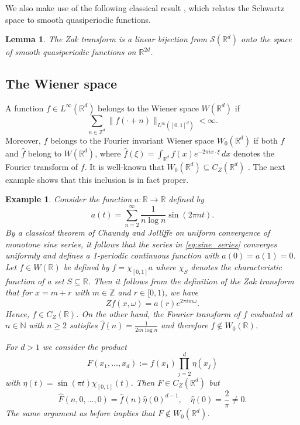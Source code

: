\documentclass[reqno,a4paper,12pt]{amsart}
\numberwithin{equation}{section}
\newtheorem{lemma}[definition]{Lemma}
\newtheorem{example}[definition]{Example}
\def\N{{\mathbb N}}
\def\Z{{\mathbb Z}}
\def\R{{\mathbb R}}
\newcommand{\Rd}{{\R^d}}
\newcommand\1{\mathds{1}}
\begin{document}
We also make use of the following classical result \cite[Theorem 8.2.5]{Groechenig}, which relates the Schwartz space to smooth quasiperiodic functions.

\begin{lemma}\label{lma:Zak_bijection}
The Zak transform is a linear bijection from $\mathcal{S}(\mathbb{R}^d)$ onto the space of smooth quasiperiodic functions on $\R^{2d}$.
\end{lemma}

\subsection{The Wiener space}\label{sec:wiener}

A function $f \in L^\infty(\Rd)$ belongs to the Wiener space $W(\Rd)$ if
$$
\sum_{n \in \Z^d} \| f(\cdot + n) \|_{L^\infty([0,1]^d)} < \infty.
$$
Moreover, $f$ belongs to the Fourier invariant Wiener space $W_0(\Rd)$ if both $f$ and $\hat f$ belong to $W(\Rd)$, where $\hat f(\xi) = \int_{\Rd} f(x) e^{-2\pi i x \cdot \xi} \, dx$ denotes the Fourier transform of $f$. It is well-known that $W_0(\Rd) \subseteq C_Z(\Rd)$ \cite{Groechenig}. The next example shows that this inclusion is in fact proper.

\begin{example}
    Consider the function $a : \R \to \R$ defined by
    \begin{equation}\label{eq:sine_series}
        a(t) = \sum_{n=2}^\infty \frac{1}{n \log n} \sin (2\pi nt).
    \end{equation} 
    By a classical theorem of Chaundy and Jolliffe \cite{chaundy1917uniform} on uniform convergence of monotone sine series, it follows that the series in \eqref{eq:sine_series} converges uniformly and defines a 1-periodic continuous function with $a(0)=a(1)=0$. Let $f \in W(\R)$ be defined by $f = \chi_{[0,1]} a$ where $\chi_S$ denotes the characteristic function of a set $S \subseteq \R$. Then it follows from the definition of the Zak transform that for $x=m+r$ with $m \in \Z$ and $r \in [0,1)$, we have
    $$
    Zf(x,\omega) = a(r) e^{2\pi i m \omega}.
    $$
    Hence, $f \in C_Z(\R)$. On the other hand, the Fourier transform of $f$ evaluated at $n \in \N$ with $n \geq 2$ satisfies
    $
    \hat f(n) = \frac{1}{2i n \log n}
    $
    and therefore $f \not \in W_0(\R)$.

    For $d > 1$ we consider the product
    $$
    F(x_1, \dots, x_d) := f(x_1) \prod_{j=2}^d \eta(x_j)
    $$
    with $\eta(t) = \sin(\pi t) \chi_{[0,1]}(t)$. Then $F \in C_Z(\Rd)$ but
    $$
    \hat F(n,0,\dots, 0) = \hat f(n) \hat \eta(0)^{d-1}, \quad \hat \eta(0) = \frac 2 \pi \neq 0.
    $$
    The same argument as before implies that $F \not \in W_0(\Rd)$.
\end{example}
\end{document}
